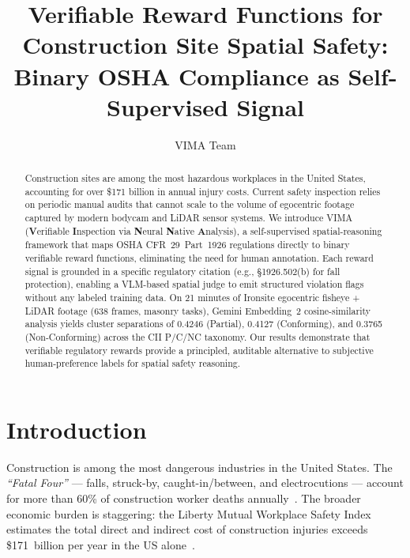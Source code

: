 \documentclass[sigconf,nonacm]{acmart}
\title{Verifiable Reward Functions for Construction Site Spatial Safety:\\
       Binary OSHA Compliance as Self-Supervised Signal}
\author{VIMA Team}
\affiliation{%
  \institution{HackTech 2025 --- Caltech}
  \city{Pasadena}
  \state{California}
  \country{USA}
}
\begin{document}
\begin{abstract}
Construction sites are among the most hazardous workplaces in the United
States, accounting for over \$171 billion in annual injury costs.
Current safety inspection relies on periodic manual audits that cannot
scale to the volume of egocentric footage captured by modern bodycam and
LiDAR sensor systems.
We introduce VIMA (\textbf{V}erifiable \textbf{I}nspection via \textbf{N}eural
\textbf{N}ative \textbf{A}nalysis), a self-supervised spatial-reasoning
framework that maps OSHA CFR~29~Part~1926 regulations directly to
binary verifiable reward functions, eliminating the need for human
annotation.
Each reward signal is grounded in a specific regulatory citation
(e.g., \S1926.502(b) for fall protection), enabling a VLM-based spatial
judge to emit structured violation flags without any labeled training data.
On 21 minutes of Ironsite egocentric fisheye + LiDAR footage (638 frames,
masonry tasks), Gemini Embedding~2 cosine-similarity analysis yields
cluster separations of 0.4246 (Partial), 0.4127 (Conforming), and 0.3765
(Non-Conforming) across the CII P/C/NC taxonomy.
Our results demonstrate that verifiable regulatory rewards provide a
principled, auditable alternative to subjective human-preference labels for
spatial safety reasoning.
\end{abstract}


\maketitle

\section{Introduction}
\label{sec:intro}

Construction is among the most dangerous industries in the United States.
The \emph{``Fatal Four''} --- falls, struck-by, caught-in/between, and
electrocutions --- account for more than 60\% of construction worker deaths
annually~\cite{osha2024construction}.
The broader economic burden is staggering: the Liberty Mutual Workplace
Safety Index estimates the total direct and indirect cost of construction
injuries exceeds \$171~billion per year in the US
alone~\cite{libertymutual2023}.
\end{document}
